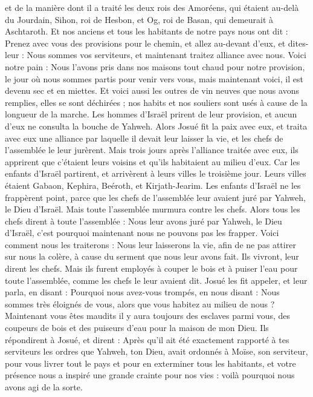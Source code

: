 \begin{multicols}{2}
et de la manière dont il a traité les deux rois des Amoréens, qui étaient au-delà du Jourdain, Sihon, roi de Hesbon, et Og, roi de Basan, qui demeurait à Aschtaroth.
Et nos anciens et tous les habitants de notre pays nous ont dit : Prenez avec vous des provisions pour le chemin, et allez au-devant d’eux, et dites-leur : Nous sommes vos serviteurs, et maintenant traitez alliance avec nous.
Voici notre pain : Nous l’avons pris dans nos maisons tout chaud pour notre provision, le jour où nous sommes partis pour venir vers vous, mais maintenant voici, il est devenu sec et en miettes.
Et voici aussi les outres de vin neuves que nous avons remplies, elles se sont déchirées ; nos habits et nos souliers sont usés à cause de la longueur de la marche.
Les hommes d’Israël prirent de leur provision, et aucun d’eux ne consulta la bouche de Yahweh\FTNT{}.
Alors Josué fit la paix avec eux, et traita avec eux une alliance par laquelle il devait leur laisser la vie, et les chefs de l’assemblée le leur jurèrent.
Mais trois jours après l’alliance traitée avec eux, ils apprirent que c’étaient leurs voisins et qu’ils habitaient au milieu d’eux.
Car les enfants d’Israël partirent, et arrivèrent à leurs villes le troisième jour. Leurs villes étaient Gabaon, Kephira, Beéroth, et Kirjath-Jearim.
Les enfants d’Israël ne les frappèrent point, parce que les chefs de l’assemblée leur avaient juré par Yahweh, le Dieu d’Israël. Mais toute l’assemblée murmura contre les chefs.
Alors tous les chefs dirent à toute l’assemblée : Nous leur avons juré par Yahweh, le Dieu d’Israël, c’est pourquoi maintenant nous ne pouvons pas les frapper.
Voici comment nous les traiterons : Nous leur laisserons la vie, afin de ne pas attirer sur nous la colère, à cause du serment que nous leur avons fait.
Ils vivront, leur dirent les chefs. Mais ils furent employés à couper le bois et à puiser l’eau pour toute l’assemblée, comme les chefs le leur avaient dit\FTNT{}.
Josué les fit appeler, et leur parla, en disant : Pourquoi nous avez-vous trompés, en nous disant : Nous sommes très éloignés de vous, alors que vous habitez au milieu de nous ?
Maintenant vous êtes maudits il y aura toujours des esclaves parmi vous, des coupeurs de bois et des puiseurs d’eau pour la maison de mon Dieu.
Ils répondirent à Josué, et dirent : Après qu’il ait été exactement rapporté à tes serviteurs les ordres que Yahweh, ton Dieu, avait ordonnés à Moïse, son serviteur, pour vous livrer tout le pays et pour en exterminer tous les habitants, et votre présence nous a inspiré une grande crainte pour nos vies : voilà pourquoi nous avons agi de la sorte.

\end{multicols}
